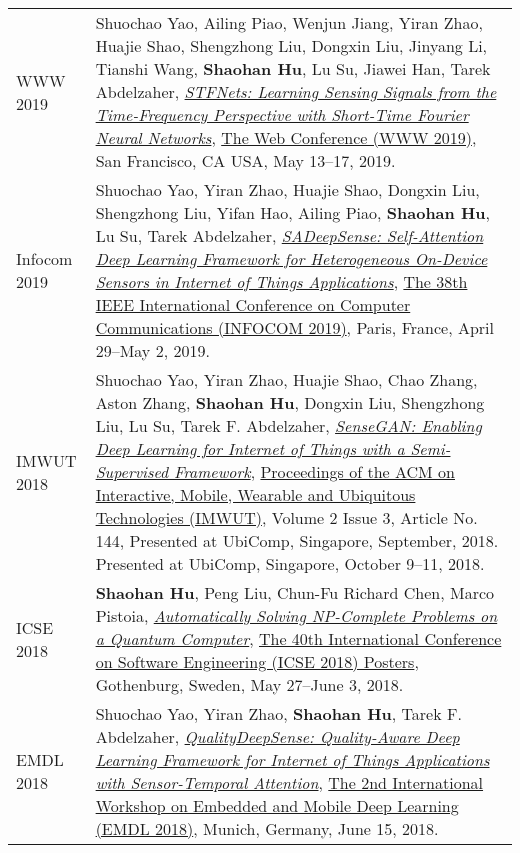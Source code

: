 \begin{longtabu}{p{.51\sectionwidth} p{.78\resumewidth}}
{\sc WWW 2019}\hypertarget{yao2019www}{} &
Shuochao Yao, Ailing Piao, Wenjun Jiang, Yiran Zhao, Huajie Shao, Shengzhong Liu, Dongxin Liu, Jinyang Li, Tianshi Wang, \textbf{Shaohan Hu}, Lu Su, Jiawei Han, Tarek Abdelzaher,
\href{https://dl.acm.org/citation.cfm?id=3313426}{\emph{STFNets: Learning Sensing Signals from the Time-Frequency Perspective with Short-Time Fourier Neural Networks}},
\href{https://www2019.thewebconf.org/}{\textsf{The Web Conference (WWW 2019)}},
San Francisco, CA USA, May 13--17, 2019. \\

{\sc Infocom 2019}\hypertarget{yao2019infocom}{} &
Shuochao Yao, Yiran Zhao, Huajie Shao, Dongxin Liu, Shengzhong Liu, Yifan Hao, Ailing Piao, \textbf{Shaohan Hu}, Lu Su, Tarek Abdelzaher,
\href{https://ieeexplore.ieee.org/document/8737500}{\emph{SADeepSense: Self-Attention Deep Learning Framework for Heterogeneous On-Device Sensors in Internet of Things Applications}},
\href{https://infocom2019.ieee-infocom.org/}{\textsf{The 38th IEEE International Conference on Computer Communications (INFOCOM 2019)}},
Paris, France, April 29--May 2, 2019. \\

{\sc IMWUT 2018}\hypertarget{yao2018imwut}{} &
Shuochao Yao, Yiran Zhao, Huajie Shao, Chao Zhang, Aston Zhang, \textbf{Shaohan Hu}, Dongxin Liu, Shengzhong Liu, Lu Su, Tarek F. Abdelzaher,
\href{https://dl.acm.org/citation.cfm?id=3264954}{\emph{SenseGAN: Enabling Deep Learning for Internet of Things with a Semi-Supervised Framework}},
\href{https://imwut.acm.org/}{\textsf{Proceedings of the ACM on Interactive, Mobile, Wearable and Ubiquitous Technologies (IMWUT)}},
Volume 2 Issue 3, Article No. 144, Presented at UbiComp, Singapore, September, 2018.
Presented at UbiComp, Singapore, October 9--11, 2018. \\

{\sc ICSE 2018}\hypertarget{hu2018icse}{} &
\textbf{Shaohan Hu}, Peng Liu, Chun-Fu Richard Chen, Marco Pistoia,
\href{https://dl.acm.org/citation.cfm?id=3194959}{\emph{Automatically Solving NP-Complete Problems on a Quantum Computer}},
\href{https://www.icse2018.org/track/icse-2018-Posters}{\textsf{The 40th International Conference on Software Engineering (ICSE 2018) Posters}},
Gothenburg, Sweden, May 27--June 3, 2018. \\

{\sc EMDL 2018}\hypertarget{yao2018emdl}{} &
Shuochao Yao, Yiran Zhao, \textbf{Shaohan Hu}, Tarek F. Abdelzaher,
\href{https://dl.acm.org/citation.cfm?id=3212729}{\emph{QualityDeepSense: Quality-Aware Deep Learning Framework for Internet of Things Applications with Sensor-Temporal Attention}},
\href{https://www.sigmobile.org/mobisys/2018/workshops/deepmobile18/index.html}{\textsf{The 2nd International Workshop on Embedded and Mobile Deep Learning (EMDL 2018)}},
Munich, Germany, June 15, 2018. \\


\end{longtabu}
